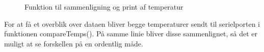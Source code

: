 \begin{figure}[h!]
  \centering
  \caption{Funktion til sammenligning og print af temperatur}
  \label{compareTemp}
\end{figure}
For at få et overblik over dataen bliver begge temperaturer sendt til serielporten i funktionen compareTemps(). På samme linie bliver disse sammenlignet, så det er muligt at se forskellen på en ordentlig måde.



